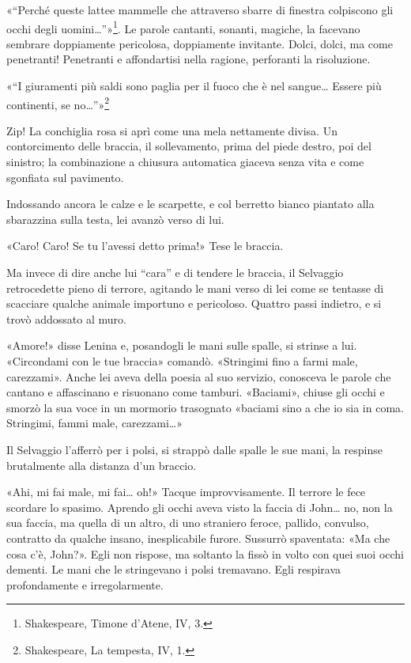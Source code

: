 \documentclass[
a5paper, %
10pt, %
twoside, 
onecolumn, %
openany, %
]{memoir}
\begin{document}
«“Perché queste lattee mammelle che attraverso sbarre di finestra colpiscono gli occhi degli uomini…”»\footnote{Shakespeare, Timone d’Atene, IV, 3.}. Le parole cantanti, sonanti, magiche, la facevano sembrare doppiamente pericolosa, doppiamente invitante. Dolci, dolci, ma come penetranti! Penetranti e affondartisi nella ragione, perforanti la risoluzione.

«“I giuramenti più saldi sono paglia per il fuoco che è nel sangue… Essere più continenti, se no…”»\footnote{Shakespeare, La tempesta, IV, 1.}

Zip! La conchiglia rosa si aprì come una mela nettamente divisa. Un contorcimento delle braccia, il sollevamento, prima del piede destro, poi del sinistro; la combinazione a chiusura automatica giaceva senza vita e come sgonfiata sul pavimento.

Indossando ancora le calze e le scarpette, e col berretto bianco piantato alla sbarazzina sulla testa, lei avanzò verso di lui.

«Caro! Caro! Se tu l’avessi detto prima!» Tese le braccia.

Ma invece di dire anche lui “cara” e di tendere le braccia, il Selvaggio retrocedette pieno di terrore, agitando le mani verso di lei come se tentasse di scacciare qualche animale importuno e pericoloso. Quattro passi indietro, e si trovò addossato al muro.

«Amore!» disse Lenina e, posandogli le mani sulle spalle, si strinse a lui. «Circondami con le tue braccia» comandò. «Stringimi fino a farmi male, carezzami». Anche lei aveva della poesia al suo servizio, conosceva le parole che cantano e affascinano e risuonano come tamburi. «Baciami», chiuse gli occhi e smorzò la sua voce in un mormorio trasognato «baciami sino a che io sia in coma. Stringimi, fammi male, carezzami…»

Il Selvaggio l’afferrò per i polsi, si strappò dalle spalle le sue mani, la respinse brutalmente alla distanza d’un braccio.

«Ahi, mi fai male, mi fai… oh!» Tacque improvvisamente. Il terrore le fece scordare lo spasimo. Aprendo gli occhi aveva visto la faccia di John… no, non la sua faccia, ma quella di un altro, di uno straniero feroce, pallido, convulso, contratto da qualche insano, inesplicabile furore. Sussurrò spaventata: «Ma che cosa c’è, John?». Egli non rispose, ma soltanto la fissò in volto con quei suoi occhi dementi. Le mani che le stringevano i polsi tremavano. Egli respirava profondamente e irregolarmente.
\end{document}
